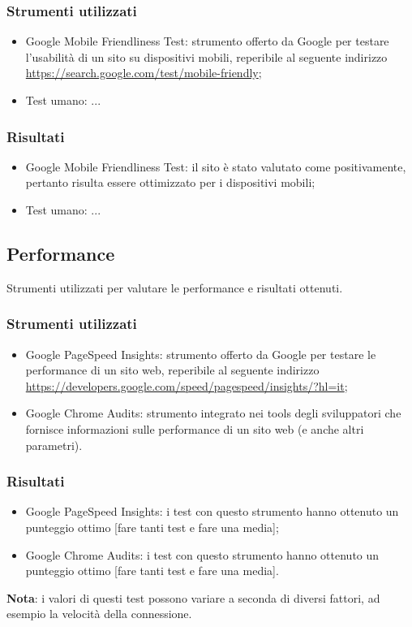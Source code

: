 \documentclass[12pt]{article}
\begin{document}
	\subsubsection{Strumenti utilizzati}
		\begin{itemize}
			\item Google Mobile Friendliness Test: strumento offerto da Google per testare l'usabilità di un sito su dispositivi mobili, reperibile al seguente indirizzo \url{https://search.google.com/test/mobile-friendly};
			\item Test umano: ...
		\end{itemize}
	\subsubsection{Risultati}
		\begin{itemize}
			\item Google Mobile Friendliness Test: il sito è stato valutato come positivamente, pertanto risulta essere ottimizzato per i dispositivi mobili;
			\item Test umano: ...
		\end{itemize}
	\subsection{Performance}
	Strumenti utilizzati per valutare le performance e risultati ottenuti.
	\subsubsection{Strumenti utilizzati}
		\begin{itemize}
			\item Google PageSpeed Insights: strumento offerto da Google per testare le performance di un sito web, reperibile al seguente indirizzo \url{https://developers.google.com/speed/pagespeed/insights/?hl=it};
			\item Google Chrome Audits: strumento integrato nei tools degli sviluppatori che fornisce informazioni sulle performance di un sito web (e anche altri parametri).
		\end{itemize}
	\subsubsection{Risultati}
		\begin{itemize}
			\item Google PageSpeed Insights: i test con questo strumento hanno ottenuto un punteggio ottimo [fare tanti test e fare una media];
			\item Google Chrome Audits: i test con questo strumento hanno ottenuto un punteggio ottimo [fare tanti test e fare una media].
		\end{itemize}
	\textbf{Nota}: i valori di questi test possono variare a seconda di diversi fattori, ad esempio la velocità della connessione.
\end{document}
